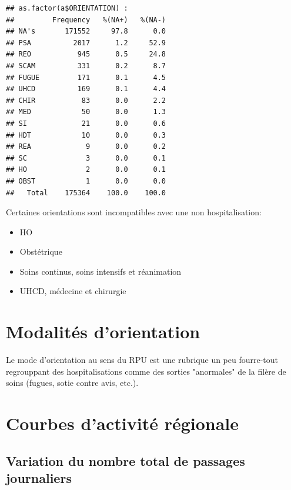 \documentclass[12pt,english,french,twoside]{report}\usepackage[]{graphicx}\usepackage[]{color}
\makeatletter
\newenvironment{kframe}{%
 \def\at@end@of@kframe{}%
 \ifinner\ifhmode%
  \def\at@end@of@kframe{\end{minipage}}%
  \begin{minipage}{\columnwidth}%
 \fi\fi%
 \def\FrameCommand##1{\hskip\@totalleftmargin \hskip-\fboxsep
 \colorbox{shadecolor}{##1}\hskip-\fboxsep
     \hskip-\linewidth \hskip-\@totalleftmargin \hskip\columnwidth}%
 \MakeFramed {\advance\hsize-\width
   \@totalleftmargin\z@ \linewidth\hsize
   \@setminipage}}%
 {\par\unskip\endMakeFramed%
 \at@end@of@kframe}
\newenvironment{knitrout}{}{} %
\makeatother
\begin{document}
\begin{knitrout}
\begin{kframe}\begin{verbatim}
## as.factor(a$ORIENTATION) : 
##         Frequency   %(NA+)   %(NA-)
## NA's       171552     97.8      0.0
## PSA          2017      1.2     52.9
## REO           945      0.5     24.8
## SCAM          331      0.2      8.7
## FUGUE         171      0.1      4.5
## UHCD          169      0.1      4.4
## CHIR           83      0.0      2.2
## MED            50      0.0      1.3
## SI             21      0.0      0.6
## HDT            10      0.0      0.3
## REA             9      0.0      0.2
## SC              3      0.0      0.1
## HO              2      0.0      0.1
## OBST            1      0.0      0.0
##   Total    175364    100.0    100.0
\end{verbatim}
\end{kframe}
\end{knitrout}

Certaines orientations sont incompatibles avec une non hospitalisation:
\begin{itemize}
  \item HO
  \item Obstétrique
  \item Soins continus, soins intensifs et réanimation
  \item UHCD, médecine et chirurgie
  
\end{itemize}




\chapter{Modalités d'orientation}



Le mode d'orientation au sens du RPU est une rubrique un peu fourre-tout regrouppant des hospitalisations comme des sorties "anormales" de la filère de soins (fugues, sotie contre avis, etc.).


\chapter{Courbes d'activité régionale}

 

\section{Variation du nombre total de passages journaliers}
\end{document}
